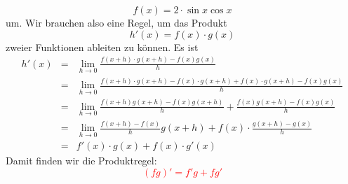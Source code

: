 \documentclass{report}
\begin{document}
\begin{equation}f(x) = 2 \cdot \sin x \cos x\end{equation}
um. Wir brauchen also eine Regel, um das Produkt
\begin{equation}h'(x) = f(x) \cdot g(x)\end{equation}
zweier Funktionen ableiten zu können. Es ist
\begin{eqnarray}h'(x) & = & \lim_{h \to 0} \frac{f(x+h) \cdot g(x+h) - f(x)g(x)}{h} \nonumber \\
& = & \lim_{h \to 0} \frac{f(x+h) \cdot g(x+h) - f(x) \cdot g(x+h) + f(x)\cdot g(x+h) - f(x)g(x)}{h} \nonumber \\
& = & \lim_{h \to 0} \frac{f(x+h)g(x+h) - f(x)g(x+h)}{h} + \frac{f(x)g(x+h)-f(x)g(x)}{h} \nonumber \\
& = & \lim_{h \to 0} \frac{f(x+h)-f(x)}{h} g(x+h)+f(x) \cdot \frac{g(x+h)-g(x)}{h} \nonumber \\
& = & f'(x) \cdot g(x) + f(x) \cdot g'(x)\end{eqnarray}
Damit finden wir die Produktregel:
\textcolor{red}{\begin{equation}(fg)' = f'g + fg'\end{equation}}
\end{document}
